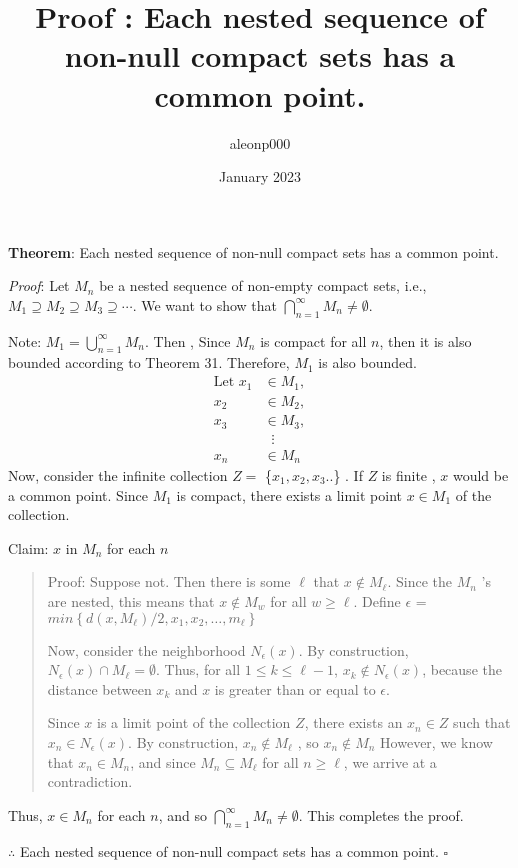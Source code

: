 \documentclass{article}
\title{Proof : Each nested sequence of non-null compact sets has a common point.}
\author{aleonp000 }
\date{January 2023}
\begin{document}
\noindent
\textbf{Theorem}:  Each nested sequence of non-null compact sets has a common point.

\textit{Proof}:  Let ${M_n}$ be a nested sequence of non-empty compact sets, i.e., $M_1 \supseteq M_2 \supseteq M_3 \supseteq \cdots$. We want to show that  $\bigcap_{n=1}^{\infty} M_n \neq \emptyset$.

Note: $M_1 $$= \bigcup_{n=1}^{\infty} M_n$. Then , Since $M_n$ is compact for all $n$, then it is also bounded according to Theorem 31. Therefore, $M_1$ is also bounded.
 \begin{align*}
\text{Let } x_1 &\in M_1, \\
      x_2 &\in M_2, \\
      x_3 &\in M_3, \\
               &\;\;\vdots 
               \\ x_n &\in M_n
\end{align*}
Now, consider the infinite collection $Z =$ \{$ x_1 , x_2 , x_3 ..$\} . If $Z$ is finite , $x$ would be a common point. Since $M_1$ is compact, there exists a limit point $x \in M_1 $ of the collection.

Claim: $x$ in $M_n$ for each $n$
 \begin{quote}
Proof: Suppose not. Then there is some $\ell$ that $x \not\in M_{\ell}$. Since the $M_n$ 's are nested, this means that $x \not\in M_{w}$ for all $w \geq \ell$. Define $\epsilon$ = $min\left\{d(x,M_{\ell})/2, x_1, x_2, \ldots, m_{\ell}\right\}$ 

Now, consider the neighborhood $N_\epsilon(x)$. By construction, $N_\epsilon(x) \cap M_{\ell} = \emptyset$. Thus, for all $1 \leq k \leq \ell - 1$, $x_k \notin N_\epsilon(x)$, because the distance between $x_k$ and $x$ is greater than or equal to $\epsilon$.

Since $x$ is a limit point of the collection $Z$, there exists an $x_n \in Z$ such that $x_n \in N_\epsilon(x)$. By construction, $x_n \notin M_{\ell}$ , so  $x_n \not\in M_n$ However, we know that $x_n \in M_n$, and since $M_n \subseteq M_{\ell}$ for all $n \geq \ell$, we arrive at a contradiction. 
\end{quote}
Thus, $x \in M_n$ for each $n$, and so $\bigcap_{n=1}^{\infty} M_n \neq \emptyset$. This completes the proof.




 \noindent 
 $\therefore$  Each nested sequence of non-null compact sets has a common point.         \hfill                     $\square$
 
\end{document}
